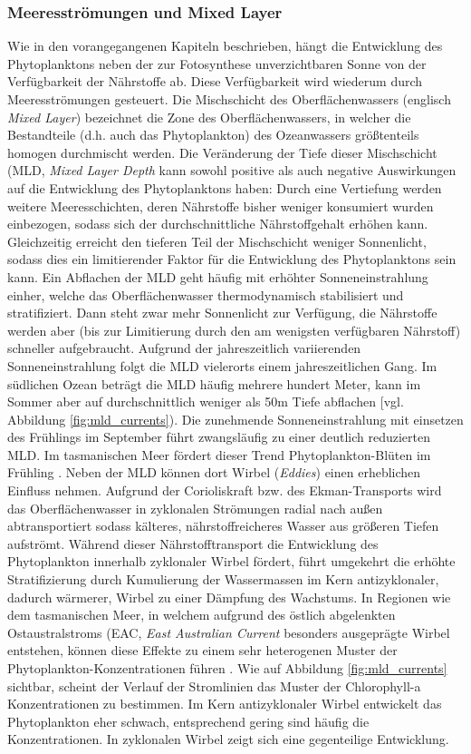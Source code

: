 \documentclass[12pt,a4paper,onecolumn,headheight=30pt]{scrartcl}
\begin{document}
\subsubsection{Meeresströmungen und Mixed Layer}
Wie in den vorangegangenen Kapiteln beschrieben, hängt die Entwicklung des Phytoplanktons neben der zur Fotosynthese unverzichtbaren Sonne von der Verfügbarkeit der Nährstoffe ab. Diese Verfügbarkeit wird wiederum durch Meeresströmungen gesteuert. Die Mischschicht des Oberflächenwassers (englisch \textit{Mixed Layer}) bezeichnet die Zone des Oberflächenwassers, in welcher die Bestandteile (d.h. auch das Phytoplankton) des Ozeanwassers größtenteils homogen durchmischt werden. Die Veränderung der Tiefe dieser Mischschicht (MLD, \textit{Mixed Layer Depth} kann sowohl positive als auch negative Auswirkungen auf die Entwicklung des Phytoplanktons haben: Durch eine Vertiefung werden weitere Meeresschichten, deren Nährstoffe bisher weniger konsumiert wurden einbezogen, sodass sich der durchschnittliche Nährstoffgehalt erhöhen kann. Gleichzeitig erreicht den tieferen Teil der Mischschicht weniger Sonnenlicht, sodass dies ein limitierender Faktor für die Entwicklung des Phytoplanktons sein kann. Ein Abflachen der MLD geht häufig mit erhöhter Sonneneinstrahlung einher, welche das Oberflächenwasser thermodynamisch stabilisiert und stratifiziert. Dann steht zwar mehr Sonnenlicht zur Verfügung, die Nährstoffe werden aber (bis zur Limitierung durch den am wenigsten verfügbaren Nährstoff) schneller aufgebraucht. Aufgrund der jahreszeitlich variierenden Sonneneinstrahlung folgt die MLD vielerorts einem jahreszeitlichen Gang. Im südlichen Ozean beträgt die MLD häufig mehrere hundert Meter, kann im Sommer aber auf durchschnittlich weniger als 50m Tiefe abflachen [vgl. Abbildung \ref{fig:mld_currents}). Die zunehmende Sonneneinstrahlung mit einsetzen des Frühlings im September führt zwangsläufig zu einer deutlich reduzierten MLD. Im tasmanischen Meer fördert dieser Trend Phytoplankton-Blüten im Frühling \citep{Tilburg.2002}. Neben der MLD können dort Wirbel (\textit{Eddies}) einen erheblichen Einfluss nehmen. Aufgrund der Corioliskraft bzw. des Ekman-Transports wird das Oberflächenwasser in zyklonalen Strömungen radial nach außen abtransportiert sodass kälteres, nährstoffreicheres Wasser aus größeren Tiefen aufströmt. Während dieser Nährstofftransport die Entwicklung des Phytoplankton innerhalb zyklonaler Wirbel fördert, führt umgekehrt die erhöhte Stratifizierung durch Kumulierung der Wassermassen im Kern antizyklonaler, dadurch wärmerer, Wirbel zu einer Dämpfung des Wachstums. In Regionen wie dem tasmanischen Meer, in welchem aufgrund des östlich abgelenkten Ostaustralstroms (EAC, \textit{East Australian Current} besonders ausgeprägte Wirbel entstehen, können diese Effekte zu einem sehr heterogenen Muster der Phytoplankton-Konzentrationen führen \citep{Tilburg.2002}. Wie auf Abbildung \ref{fig:mld_currents} sichtbar, scheint der Verlauf der Stromlinien das Muster der Chlorophyll-a Konzentrationen zu bestimmen. Im Kern antizyklonaler Wirbel entwickelt das Phytoplankton eher schwach, entsprechend gering sind häufig die Konzentrationen. In zyklonalen Wirbel zeigt sich eine gegenteilige Entwicklung.
\end{document}
